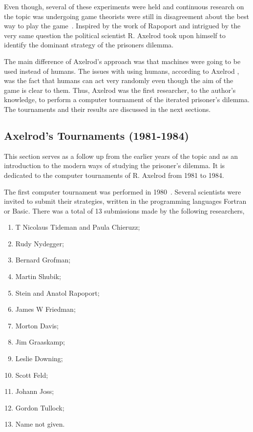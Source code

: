 \documentclass{article}
\theoremstyle{definition}
\begin{document}
Even though, several of these experiments were held and continuous research on
the topic was undergoing game theorists were still in disagreement about
the best way to play the game~\cite{rapoport1965}. Inspired by the work of
Rapoport and intrigued by the very same question the political scientist R.
Axelrod took upon himself to identify the dominant strategy of the prisoners dilemma.

The main difference of Axelrod's approach was that machines were going to be used
instead of humans. The issues with using humans, according to Axelrod
\cite{Axelrod2012}, was the fact that humans can act very randomly even though
the aim of the game is clear to them. Thus, Axelrod was the first researcher,
to the author's knowledge, to perform a computer tournament of the iterated
prisoner's dilemma. The tournaments and their results are discussed in
the next sections.

\subsection{Axelrod's Tournaments (1981-1984)}\label{subsection:axelrods_tournament}

This section serves as a follow up from the earlier years of the topic and as an
introduction to the modern ways of studying the prisoner's dilemma. It is
dedicated to the computer tournaments of R. Axelrod from 1981 to 1984.

The first computer tournament was performed in 1980~\cite{Axelrod1980a}.
Several scientists were invited to submit their strategies, written in the
programming languages Fortran or Basic. There was a total of 13 submissions
made by the following researchers,

\begin{multicols}{2}
    \begin{enumerate}
        \item T Nicolaus Tideman and Paula Chieruzz;
        \item Rudy Nydegger;
        \item Bernard Grofman;
        \item Martin Shubik;
        \item Stein and Anatol Rapoport;
        \item James W Friedman;
        \item Morton Davis;
        \item Jim Graaskamp;
        \item Leslie Downing;
        \item Scott Feld;
        \item Johann Joss;
        \item Gordon Tullock;
        \item Name not given.
    \end{enumerate}
\end{multicols}
\end{document}
